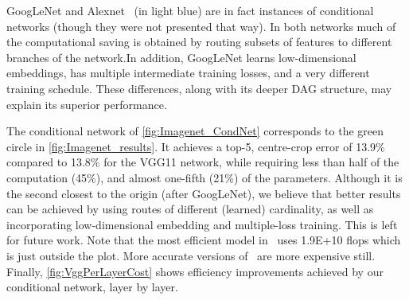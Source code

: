 \documentclass[thesis]{subfiles}
\begin{document}
	GoogLeNet and Alexnet~\citep{Krizhevsky2012} (in light blue) are in fact instances of conditional networks 
	(though they were not presented that way). In both networks much of the computational saving is obtained by routing	subsets of features to different branches of the network.In addition, GoogLeNet learns low-dimensional embeddings, has multiple intermediate training losses, and a very different training schedule. These differences, along with its deeper DAG structure, may explain its superior performance.
	
	The conditional network of \cref{fig:Imagenet_CondNet} 
	corresponds to the green circle in \cref{fig:Imagenet_results}.
	It achieves a top-5, centre-crop error of
	13.9\% compared to 13.8\% for the VGG11 network, while requiring less than half of the computation (45\%),
	and almost one-fifth (21\%) of the parameters.
	Although it is the second closest to the origin (after GoogLeNet), we believe that better results can be achieved 
	by using routes of different (learned) cardinality, as well as incorporating low-dimensional embedding and multiple-loss training. This is left for future work. 
	Note that the most efficient model in~\citep{He2015b} uses 1.9E+10 flops which is just outside the plot. 
	More accurate versions of~\citep{He2015b} are more expensive still.
	Finally, \cref{fig:VggPerLayerCost} shows efficiency improvements achieved by our conditional network, layer by layer.
	
\end{document}
